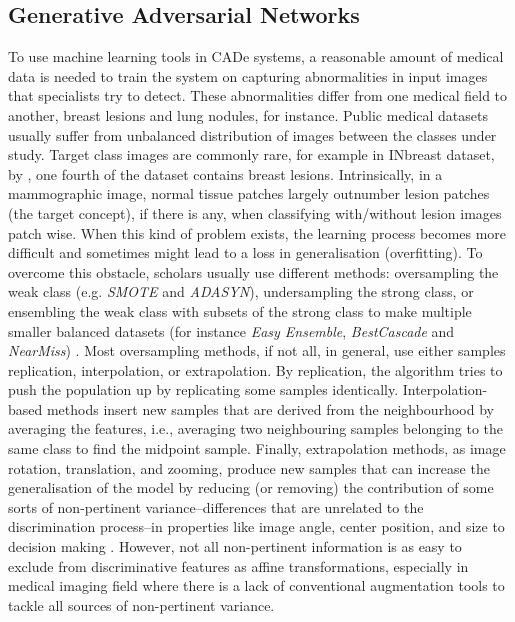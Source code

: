 \documentclass[final,3p,twocolumn,authoryear,sort&compress,times]{maia}
\begin{document}
\subsection{Generative Adversarial Networks}
\label{sec:GAN}

To use machine learning tools in CADe systems, a reasonable amount of medical data is needed to train the system on capturing abnormalities in input images that specialists try to detect. These abnormalities differ from one medical field to another, breast lesions and lung nodules, for instance. Public medical datasets usually suffer from unbalanced distribution of images between the classes under study. Target class images are commonly rare, for example in INbreast dataset, by \citet{INbreast}, one fourth of the dataset contains breast lesions. Intrinsically, in a mammographic image, normal tissue patches largely outnumber lesion patches (the target concept), if there is any, when classifying with/without lesion images patch wise. When this kind of problem exists, the learning process becomes more difficult and sometimes might lead to a loss in generalisation (overfitting). To overcome this obstacle, scholars usually use different methods: oversampling the weak class (e.g. \textit{SMOTE} and \textit{ADASYN}), undersampling the strong class, or ensembling the weak class with subsets of the strong class to make multiple smaller balanced datasets (for instance \textit{Easy Ensemble}, \textit{BestCascade} and \textit{NearMiss}) \citep{imbalanced_learning}. Most oversampling methods, if not all, in general, use either samples replication, interpolation, or extrapolation. By replication, the algorithm tries to push the population up by replicating some samples identically. Interpolation-based methods insert new samples that are derived from the neighbourhood by averaging the features, i.e., averaging two neighbouring samples belonging to the same class to find the midpoint sample. Finally, extrapolation methods, as image rotation, translation, and zooming, produce new samples that can increase the generalisation of the model by reducing (or removing) the contribution of some sorts of non-pertinent variance--differences that are unrelated to the discrimination process--in properties like image angle, center position, and size to decision making \citep{GAN_brain_aug}. However, not all non-pertinent information is as easy to exclude from discriminative features as affine transformations, especially in medical imaging field where there is a lack of conventional augmentation tools to tackle all sources of non-pertinent variance. %
\end{document}
